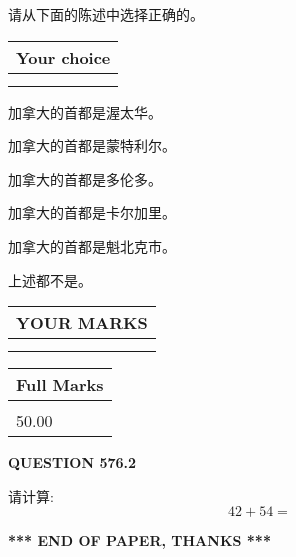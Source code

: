 \documentclass{ctexart}
\begin{document}
  
请从下面的陈述中选择正确的。
  
  
\noindent\hspace{3.0in} \begin{tabular}{|l|}
\hline
Your choice \\
\hline
 \\ 
 \\ 
\hline
\end{tabular}
  
  
 
 
加拿大的首都是渥太华。
 
 
加拿大的首都是蒙特利尔。
 
 
加拿大的首都是多伦多。
 
 
加拿大的首都是卡尔加里。
 
 
加拿大的首都是魁北克市。
 
 
 上述都不是。
 
 
  
\vspace{0.2in}
  
\noindent\begin{tabular}{|l|}
\hline
 YOUR MARKS  \\
\hline
 \\ 
 \\ 
\hline
\end{tabular}
\hspace{0.05in} \begin{tabular}{|l|}
\hline
 Full Marks  \\
\hline
 \\ 
50.00 \\
\hline
\end{tabular}
{\textbf{\Large{QUESTION
576.2 
}}}
  
  
 
请计算:
\begin{equation}
42 +  %
54 = \nonumber
\end{equation}
 

 

 
   
   
 \vspace{0.2in}
 
   
   
   
   
\vspace{1.0in} 
{\textbf{\large{ *** END OF PAPER, THANKS *** }}} 
   
\end{document}
